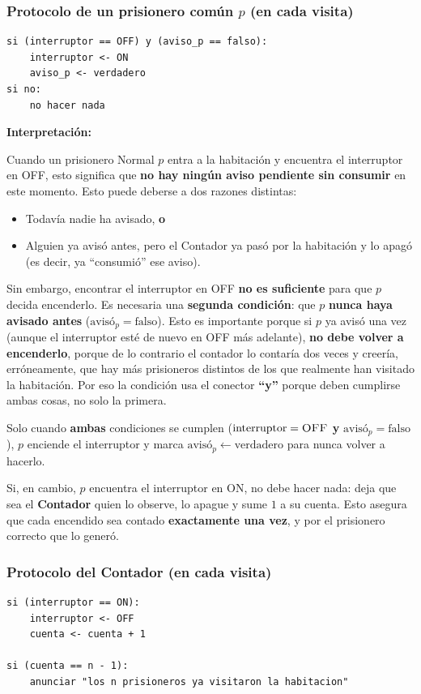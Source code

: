\subsubsection*{Protocolo de un prisionero común $p$ (en cada visita)}
\begin{verbatim}
si (interruptor == OFF) y (aviso_p == falso):
    interruptor <- ON
    aviso_p <- verdadero
si no:
    no hacer nada
\end{verbatim}

\textbf{Interpretación:}

Cuando un prisionero Normal $p$ entra a la habitación y encuentra el interruptor en \textsc{OFF}, esto significa que \textbf{no hay ningún aviso pendiente sin consumir} en este momento. Esto puede deberse a dos razones distintas:

\begin{itemize}
    \item Todavía nadie ha avisado, \textbf{o}
    \item Alguien ya avisó antes, pero el Contador ya pasó por la habitación y lo apagó (es decir, ya ``consumió'' ese aviso).
\end{itemize}

Sin embargo, encontrar el interruptor en \textsc{OFF} \textbf{no es suficiente} para que $p$ decida encenderlo. Es necesaria una \textbf{segunda condición}: que $p$ \textbf{nunca haya avisado antes} ($\text{avis\'o}_p = \text{falso}$). Esto es importante porque si $p$ ya avisó una vez (aunque el interruptor esté de nuevo en \textsc{OFF} más adelante), \textbf{no debe volver a encenderlo}, porque de lo contrario el contador lo contaría dos veces y creería, erróneamente, que hay más prisioneros distintos de los que realmente han visitado la habitación. Por eso la condición usa el conector \textbf{``y''} porque deben cumplirse ambas cosas, no solo la primera.

Solo cuando \textbf{ambas} condiciones se cumplen ($\text{interruptor} = \textsc{OFF}$ \textbf{y} $\text{avis\'o}_p = \text{falso}$), $p$ enciende el interruptor y marca $\text{avis\'o}_p \leftarrow \text{verdadero}$ para nunca volver a hacerlo.

Si, en cambio, $p$ encuentra el interruptor en \textsc{ON}, no debe hacer nada: deja que sea el \textbf{Contador} quien lo observe, lo apague y sume $1$ a su cuenta. Esto asegura que cada encendido sea contado \textbf{exactamente una vez}, y por el prisionero correcto que lo generó.

\subsubsection*{Protocolo del Contador (en cada visita)}
\begin{verbatim}
si (interruptor == ON):
    interruptor <- OFF
    cuenta <- cuenta + 1

si (cuenta == n - 1):
    anunciar "los n prisioneros ya visitaron la habitacion"
\end{verbatim}

